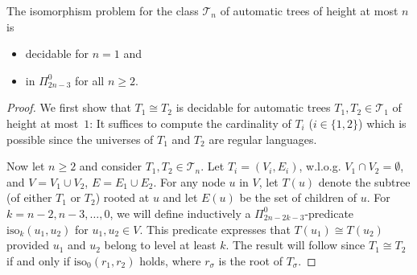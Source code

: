 \documentclass[envcountsame]{llncs}
\newcommand{\T}{\mathcal T}
\begin{document}
\begin{proposition}
\label{prop:tree_membership}
  The isomorphism problem for the class $\T_n$ of automatic trees of
  height at most $n$ is
  \begin{itemize}
  \item decidable for $n=1$ and
  \item in $\Pi^0_{2n-3}$ for all $n \geq 2$.
  \end{itemize}
\end{proposition}

\begin{proof}
  We first show that $T_1\cong T_2$ is decidable for automatic trees
  $T_1, T_2 \in \T_1$ of height at most~$1$: It suffices to compute
  the cardinality of $T_i$ ($i \in \{1,2\}$) which is possible since
  the universes of $T_1$ and $T_2$ are regular languages.

  Now let $n\ge2$ and consider $T_1,T_2\in \T_n$.
  Let $T_i = (V_i,E_i)$, w.l.o.g. $V_1 \cap V_2 = \emptyset$, and $V =
  V_1 \cup V_2$, $E = E_1 \cup E_2$.  For any node $u$ in $V$, let
  $T(u)$ denote the subtree (of either $T_1$ or $T_2$) rooted at $u$
  and let $E(u)$ be the set of children of $u$.  For
  $k=n-2,n-3,\dots,0$, we will define inductively a
  $\Pi^0_{2n-2k-3}$-predicate $\text{iso}_k(u_1,u_2)$ for $u_1,u_2\in
  V$. This predicate expresses that $T(u_1) \cong T(u_2)$ provided
  $u_1$ and $u_2$ belong to level at least $k$.  The result will follow since
  $T_1\cong T_2$ if and only if $\text{iso}_0(r_1,r_2)$ holds, where $r_\sigma$ is
  the root of $T_\sigma$.


\end{proof}
\end{document}
